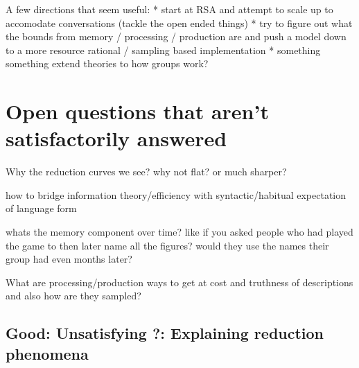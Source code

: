 \documentclass[]{article}
\begin{document}
A few directions that seem useful:
* start at RSA and attempt to scale up to accomodate conversations (tackle the open ended things)
* try to figure out what the bounds from memory / processing / production are and push a model down to a more resource rational / sampling based implementation
* something something extend theories to how groups work?



\section{Open questions that aren't satisfactorily answered}

Why the reduction curves we see? why not flat? or much sharper? 

how to bridge information theory/efficiency with syntactic/habitual expectation of language form 

whats the memory component over time? like if you asked people who had played the game to then later name all the figures? would they use the names their group had even months later? 

What are processing/production ways to get at cost and truthness of descriptions and also how are they sampled? 

















\subsection{Good: Unsatisfying ?: Explaining reduction phenomena}
\end{document}

